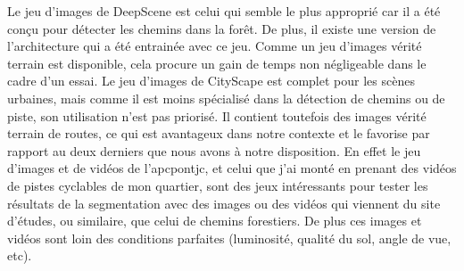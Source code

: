 ﻿\noindent Le jeu d'images de DeepScene est celui qui semble le plus approprié car il a été conçu pour détecter les chemins dans la forêt. De plus, il existe une version de l'architecture qui a été entrainée avec ce jeu. Comme un jeu d'images vérité terrain est disponible, cela procure un gain de temps non négligeable dans le cadre d'un essai. Le jeu d'images de CityScape est complet pour les scènes urbaines, mais comme il est moins spécialisé dans la détection de chemins ou de piste, son utilisation n'est pas priorisé. Il contient toutefois des images vérité terrain de routes, ce qui est avantageux dans notre contexte et le favorise par rapport au deux derniers que nous avons à notre disposition. En effet le jeu d'images et de vidéos de l'\acrshort{apcpontjc}, et celui que j'ai monté en prenant des vidéos de pistes cyclables de mon quartier, sont des jeux intéressants pour tester les résultats de la segmentation avec des images ou des vidéos qui viennent du site d'études, ou similaire, que celui de chemins forestiers. De plus ces images et vidéos sont loin des conditions parfaites (luminosité, qualité du sol, angle de vue, etc).
